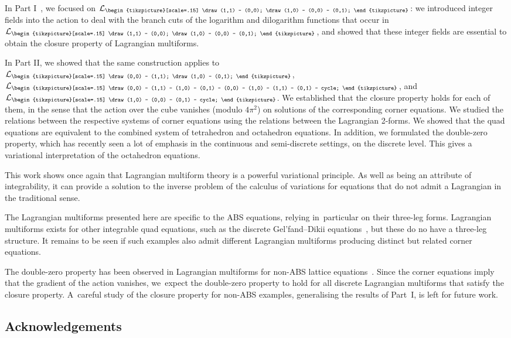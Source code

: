 \documentclass[10pt,a4paper]{amsart}
\newcommand{\crosssquare}{{\begin{tikzpicture}[scale=.15]
			\draw (0,0) -- (1,1) -- (1,0) -- (0,1) -- (0,0) -- (1,0) -- (1,1) -- (0,1) -- cycle;
\end{tikzpicture}}}
\newcommand{\cross}{{\begin{tikzpicture}[scale=.15]
			\draw (0,0) -- (1,1);
			\draw (1,0) -- (0,1);
\end{tikzpicture}}}
\newcommand{\triang}{{\begin{tikzpicture}[scale=.15]
			\draw (1,0) -- (0,0) -- (0,1) -- cycle;
\end{tikzpicture}}}
\newcommand{\trileg}{{\begin{tikzpicture}[scale=.15]
			\draw (1,1) -- (0,0);
			\draw (1,0) -- (0,0) -- (0,1);
\end{tikzpicture}}}
\newcommand{\cL}{\mathcal{L}}
\numberwithin{equation}{section}
\begin{document}
In Part I~\cite{richardson2025discrete1}, we focused on $\cL_\trileg$: we introduced integer fields into the action to deal with the branch cuts of the logarithm and dilogarithm functions that occur in $\cL_\trileg$, and showed that these integer fields are essential to obtain the closure property of Lagrangian multiforms.

In Part II, we showed that the same construction applies to $\cL_\cross$, $\cL_\crosssquare$, and $\cL_\triang$. We established that the closure property holds for each of them, in the sense that the action over the cube vanishes \big(modulo $4 \pi^2$\big) on solutions of the corresponding corner equations.
We studied the relations between the respective systems of corner equations using the relations between the Lagrangian 2-forms. We showed that the quad equations are equivalent to the combined system of tetrahedron and octahedron equations. In addition, we formulated the double-zero property, which has recently seen a lot of emphasis in the continuous and semi-discrete settings, on the discrete level. This gives a variational interpretation of the octahedron equations.

This work shows once again that Lagrangian multiform theory is a powerful variational principle. As well as being an attribute of integrability, it can provide a solution to the inverse problem of the calculus of variations for equations that do not admit a Lagrangian in the traditional sense.

The Lagrangian multiforms presented here are specific to the ABS equations, relying in~particular on their three-leg forms. Lagrangian multiforms exists for other integrable quad equations, such as the discrete Gel'fand--Dikii equations~\cite{lobb2010lagrangian}, but these do no have a three-leg structure. It remains to be seen if such examples also admit different Lagrangian multiforms producing distinct but related corner equations.

The double-zero property has been observed in Lagrangian multiforms for non-ABS lattice equations~\cite{nijhoff2024lagrangianb, nijhoff2024lagrangian}. Since the corner equations imply that the gradient of the action vanishes, we~expect the double-zero property to hold for all discrete Lagrangian multiforms that satisfy the closure property. A~careful study of the closure property for non-ABS examples, generalising the results of Part~I, is left for future work.

\subsection*{Acknowledgements}
\end{document}
